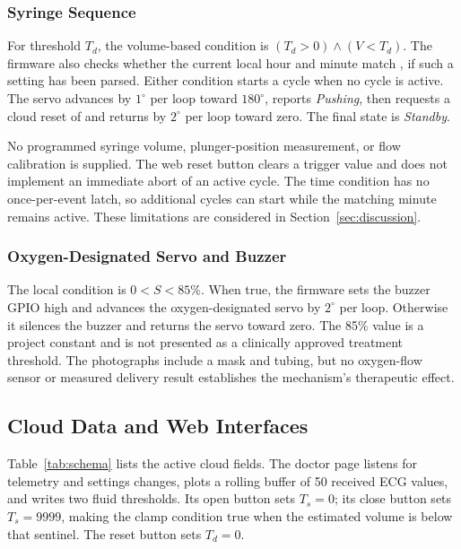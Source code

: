 \subsubsection{Syringe Sequence}
For threshold $T_d$, the volume-based condition is $(T_d>0)\land(V<T_d)$. The firmware also checks whether the current local hour and minute match , if such a setting has been parsed. Either condition starts a cycle when no cycle is active. The servo advances by $1^{\circ}$ per loop toward $180^{\circ}$, reports \emph{Pushing}, then requests a cloud reset of  and returns by $2^{\circ}$ per loop toward zero. The final state is \emph{Standby}.

No programmed syringe volume, plunger-position measurement, or flow calibration is supplied. The web reset button clears a trigger value and does not implement an immediate abort of an active cycle. The time condition has no once-per-event latch, so additional cycles can start while the matching minute remains active. These limitations are considered in Section~\ref{sec:discussion}.

\subsubsection{Oxygen-Designated Servo and Buzzer}
The local condition is $0<S<85\%$. When true, the firmware sets the buzzer GPIO high and advances the oxygen-designated servo by $2^{\circ}$ per loop. Otherwise it silences the buzzer and returns the servo toward zero. The 85\% value is a project constant and is not presented as a clinically approved treatment threshold. The photographs include a mask and tubing, but no oxygen-flow sensor or measured delivery result establishes the mechanism's therapeutic effect.

\subsection{Cloud Data and Web Interfaces}
Table~\ref{tab:schema} lists the active cloud fields. The doctor page listens for telemetry and settings changes, plots a rolling buffer of 50 received ECG values, and writes two fluid thresholds. Its open button sets $T_s=0$; its close button sets $T_s=9999$, making the clamp condition true when the estimated volume is below that sentinel. The reset button sets $T_d=0$.

